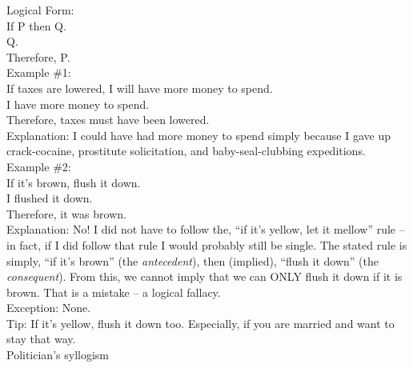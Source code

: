 \documentclass[a4paper,12pt,single,pdftex]{scrbook}
\begin{document}
    
      Logical Form:
    \\

    
      If P then Q.
    \\

    
      Q.
    \\

    
      Therefore, P.
    \\

    
      Example \#1:
    \\

    
      If taxes are lowered, I will have more money to spend.
    \\

    
      I have more money to spend.
    \\

    
      Therefore, taxes must have been lowered.
    \\

    
      Explanation: I could have had more money to spend simply because I gave up crack-cocaine, prostitute solicitation, and baby-seal-clubbing expeditions.
    \\

    
      Example \#2:
    \\

    
      If it’s brown, flush it down.
    \\

    
      I flushed it down.
    \\

    
      Therefore, it was brown.
    \\

    
      Explanation: No!  I did not have to follow the, “if it’s yellow, let it mellow” rule -- in fact, if I did follow that rule I would probably still be single.  The stated rule is simply, “if it’s brown” (the {\it antecedent}), then (implied), “flush it down” (the {\it consequent}).  From this, we cannot imply that we can ONLY flush it down if it is brown.  That is a mistake -- a logical fallacy.
    \\

    
      Exception: None.
    \\

    
      Tip: If it’s yellow, flush it down too. Especially, if you are married and want to stay that way.
    \\

  

Politician's syllogism
    
\end{document}

